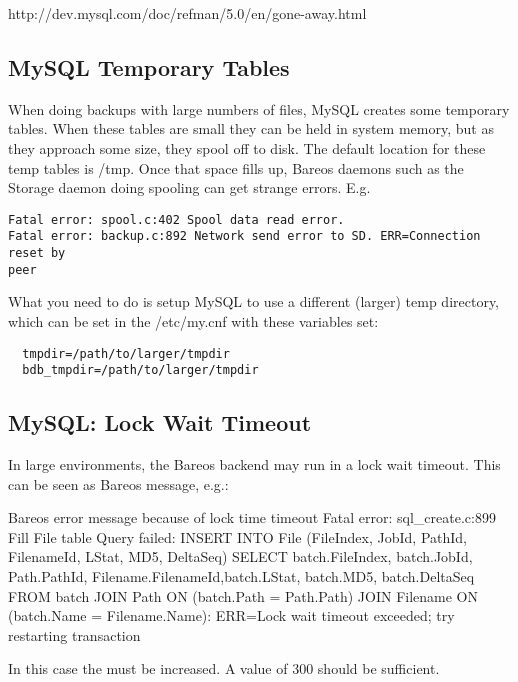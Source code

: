 {http://dev.mysql.com/doc/refman/5.0/en/gone-away.html}

\subsection{MySQL Temporary Tables}
When doing backups with large numbers of files, MySQL creates some
temporary tables.  When these tables are small they can be held in
system memory, but as they approach some size, they
spool off to disk.  The default location for these temp tables is
/tmp.  Once that space fills up, Bareos daemons such as the Storage
daemon doing spooling can get strange errors. E.g.

\footnotesize
\begin{verbatim}
Fatal error: spool.c:402 Spool data read error.
Fatal error: backup.c:892 Network send error to SD. ERR=Connection reset by
peer
\end{verbatim}
\normalsize

What you need to do is setup MySQL to use a different (larger) temp
directory, which can be set in the /etc/my.cnf with these variables
set:

\footnotesize
\begin{verbatim}
  tmpdir=/path/to/larger/tmpdir
  bdb_tmpdir=/path/to/larger/tmpdir
\end{verbatim}
\normalsize



\subsection{MySQL: Lock Wait Timeout}

In large environments, the Bareos \mysql backend may run in a lock wait timeout.
This can be seen as Bareos message, e.g.:

\begin{bmessage}{Bareos error message because of \mysql lock time timeout}
Fatal error: sql_create.c:899 Fill File table Query failed: INSERT INTO File (FileIndex, JobId, PathId, FilenameId, LStat, MD5, DeltaSeq) SELECT batch.FileIndex, batch.JobId, Path.PathId, Filename.FilenameId,batch.LStat, batch.MD5, batch.DeltaSeq FROM batch JOIN Path ON (batch.Path = Path.Path) JOIN Filename ON (batch.Name = Filename.Name): ERR=Lock wait timeout exceeded; try restarting transaction
\end{bmessage}

In this case the \mysql {} must be increased.
A value of 300 should be sufficient.

